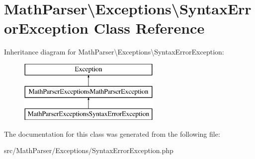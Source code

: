 \hypertarget{classMathParser_1_1Exceptions_1_1SyntaxErrorException}{\section{Math\-Parser\textbackslash{}Exceptions\textbackslash{}Syntax\-Error\-Exception Class Reference}
\label{classMathParser_1_1Exceptions_1_1SyntaxErrorException}
}
Inheritance diagram for Math\-Parser\textbackslash{}Exceptions\textbackslash{}Syntax\-Error\-Exception\-:\begin{figure}[H]
\begin{center}
\leavevmode
\includegraphics[height=3.000000cm]{classMathParser_1_1Exceptions_1_1SyntaxErrorException}
\end{center}
\end{figure}


The documentation for this class was generated from the following file\-:\begin{DoxyCompactItemize}
\item 
src/\-Math\-Parser/\-Exceptions/Syntax\-Error\-Exception.\-php\end{DoxyCompactItemize}
